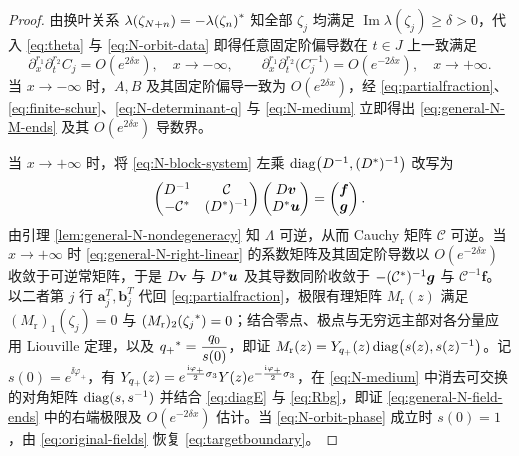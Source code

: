 \begin{proof}
由换叶关系 $\lambda(\zeta_{N+n})=-{\lambda(\zeta_n)}^{*}$ 知全部 $\zeta_j$ 均满足 $\operatorname{Im}\lambda(\zeta_j)\ge\delta>0$，代入 \eqref{eq:theta} 与 \eqref{eq:N-orbit-data} 即得任意固定阶偏导数在 $t\in J$ 上一致满足
\begin{equation*}
\partial_x^{r_1}\partial_t^{r_2}C_j=O(e^{2\delta x}),\quad x\longrightarrow-\infty,\qquad
\partial_x^{r_1}\partial_t^{r_2}\bigl(C_j^{-1}\bigr)=O(e^{-2\delta x}),\quad x\longrightarrow+\infty.
\end{equation*}
当 $x\to-\infty$ 时，$A,B$ 及其固定阶偏导一致为 $O(e^{2\delta x})$，经 \eqref{eq:partialfraction}、\eqref{eq:finite-schur}、\eqref{eq:N-determinant-q} 与 \eqref{eq:N-medium} 立即得出 \eqref{eq:general-N-M-ends} 及其 $O(e^{2\delta x})$ 导数界。

当 $x\to+\infty$ 时，将 \eqref{eq:N-block-system} 左乘 $\operatorname{diag}\bigl(D^{-1},({D}^{*})^{-1}\bigr)$ 改写为
\begin{equation}\label{eq:general-N-right-linear}
\begin{pmatrix}D^{-1}&\mathcal C\\-{\mathcal C}^{*}&({D}^{*})^{-1}\end{pmatrix}
\begin{pmatrix}D\boldsymbol v\\{D}^{*}\boldsymbol u\end{pmatrix}
=\begin{pmatrix}\boldsymbol f\\\boldsymbol g\end{pmatrix}.
\end{equation}
由引理 \ref{lem:general-N-nondegeneracy} 知 $\Lambda$ 可逆，从而 Cauchy 矩阵 $\mathcal C$ 可逆。当 $x\to+\infty$ 时 \eqref{eq:general-N-right-linear} 的系数矩阵及其固定阶导数以 $O(e^{-2\delta x})$ 收敛于可逆常矩阵，于是 $D\boldsymbol v$ 与 ${D}^{*}\boldsymbol u$ 及其导数同阶收敛于 $-({\mathcal C}^{*})^{-1}\boldsymbol g$ 与 $\mathcal C^{-1}\boldsymbol f$。以二者第 $j$ 行 $\boldsymbol a_j^T,\boldsymbol b_j^T$ 代回 \eqref{eq:partialfraction}，极限有理矩阵 $M_{\mathrm{r}}(z)$ 满足 $(M_{\mathrm{r}})_1(\zeta_j)=0$ 与 $(M_{\mathrm{r}})_2({\zeta_j}^{*})=0$；结合零点、极点与无穷远主部对各分量应用 Liouville 定理，以及 ${q_+}^{*}=\dfrac{q_0}{s(0)}$，即证 $M_{\mathrm{r}}(z)=Y_{q_+}(z)\operatorname{diag}\bigl(s(z),s(z)^{-1}\bigr)$。记 $s(0)=e^{\ii\varphi_+}$，有 $Y_{q_+}(z)=e^{\frac{\mathrm{i}\varphi_+}{2}\sigma_3}Y(z)e^{-\frac{\mathrm{i}\varphi_+}{2}\sigma_3}$，在 \eqref{eq:N-medium} 中消去可交换的对角矩阵 $\operatorname{diag}(s,s^{-1})$ 并结合 \eqref{eq:diagE} 与 \eqref{eq:Rbg}，即证 \eqref{eq:general-N-field-ends} 中的右端极限及 $O(e^{-2\delta x})$ 估计。当 \eqref{eq:N-orbit-phase} 成立时 $s(0)=1$，由 \eqref{eq:original-fields} 恢复 \eqref{eq:targetboundary}。
\end{proof}

